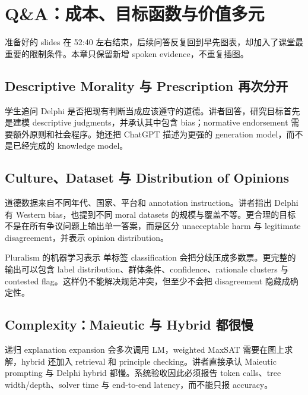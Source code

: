 \section{Q\&A：成本、目标函数与价值多元}

准备好的 slides 在 52:40 左右结束，后续问答反复回到早先图表，却加入了课堂最重要的限制条件。本章只保留新增 spoken evidence，不重复插图。

\subsection{Descriptive Morality 与 Prescription 再次分开}

学生追问 Delphi 是否把现有判断当成应该遵守的道德。讲者回答，研究目标首先是建模 descriptive judgments，并承认其中包含 bias；normative endorsement 需要额外原则和社会程序。她还把 ChatGPT 描述为更强的 generation model，而不是已经完成的 knowledge model。


\subsection{Culture、Dataset 与 Distribution of Opinions}

道德数据来自不同年代、国家、平台和 annotation instruction。讲者指出 Delphi 有 Western bias，也提到不同 moral datasets 的规模与覆盖不等。更合理的目标不是在所有争议问题上输出单一答案，而是区分 unacceptable harm 与 legitimate disagreement，并表示 opinion distribution。

\begin{knowledgebox}{Pluralism 的机器学习表示}
单标签 classification 会把分歧压成多数票。更完整的输出可以包含 label distribution、群体条件、confidence、rationale clusters 与 contested flag。这样仍不能解决规范冲突，但至少不会把 disagreement 隐藏成确定性。
\end{knowledgebox}

\subsection{Complexity：Maieutic 与 Hybrid 都很慢}

递归 explanation expansion 会多次调用 LM，weighted MaxSAT 需要在图上求解，hybrid 还加入 retrieval 和 principle checking。讲者直接承认 Maieutic prompting 与 Delphi hybrid 都慢。系统验收因此必须报告 token calls、tree width/depth、solver time 与 end-to-end latency，而不能只报 accuracy。

